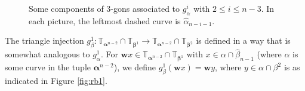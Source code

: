 \documentclass[11pt]{article}
\theoremstyle{plain} \newtheorem{thm}{Theorem}[subsection]
\theoremstyle{plain} \newtheorem{cor}[thm]{Corollary}
\theoremstyle{plain} \newtheorem{prop}[thm]{Proposition}
\theoremstyle{plain} \newtheorem{conj}[thm]{Conjecture}
\theoremstyle{plain} \newtheorem{lem}[thm]{Lemma}
\theoremstyle{definition} \newtheorem{df}[thm]{Definition}
\theoremstyle{remark} \newtheorem{rmk}[thm]{Remark}
\theoremstyle{remark} \newtheorem{obs}[thm]{Observation}
\newcommand{\ah}{\widehat{\alpha}}
\newcommand{\bh}{\widehat{\beta}}
\newcommand{\ba}{\boldsymbol{\alpha}}
\newcommand{\bb}{\boldsymbol{\beta}}
\newcommand{\bw}{\mathbf{w}}
\newcommand{\tor}[1]{\mathbb{T}_{#1}}
\numberwithin{equation}{section}
\begin{document}
\begin{figure}[h]
\centering
\begin{minipage}[c]{.60\linewidth}
\quad
{}
\end{minipage}
\begin{minipage}[c]{.35\linewidth}
\caption[Components of 3-gons for $g_{\alpha}^{i} (i>1)$ in the proof of Lemma \ref{lem:RredR}]{Some components of 3-gons associated to $g_{\alpha}^i$ with $2 \leq i \leq n-3.$  In each picture, the leftmost dashed curve is $\ah_{n-i-1}.$\label{fig:hstri}}
\end{minipage}
\end{figure}

The triangle injection $g_{\beta}^1:\tor{\ba^{n-2}} \cap \tor{\bb^1} \rightarrow \tor{\ba^{n-2}} \cap \tor{\bb^{2}}$ is defined in a way that is somewhat analogous to $g_{\alpha}^1$.  For $\bw x \in \tor{\ba^{n-2}} \cap \tor{\bb^1}$ with $x \in \alpha \cap \bh_{n-1}$ (where $\alpha$ is some curve in the tuple $\ba^{n-2}$), we define $g_{\beta}^1(\bw x) = \bw y$, where $y \in \alpha \cap \beta^2$ is as indicated in Figure \ref{fig:rb1}.
\end{document}
